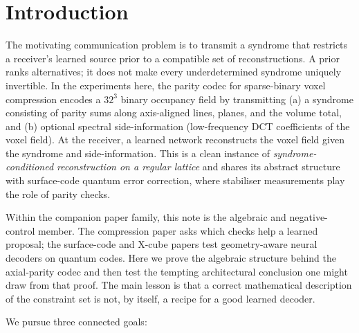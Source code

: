 \documentclass[11pt,a4paper]{article}
\begin{document}
\section{Introduction}
\label{sec:intro}

The motivating communication problem is to transmit a syndrome that
restricts a receiver's learned source prior to a compatible set of
reconstructions. A prior ranks alternatives; it does not make every
underdetermined syndrome uniquely invertible. In the experiments here,
the parity codec for sparse-binary voxel compression encodes a $32^3$
binary occupancy field by transmitting (a) a syndrome consisting of
parity sums along axis-aligned lines, planes, and the volume total,
and (b) optional spectral side-information (low-frequency DCT
coefficients of the voxel field). At the receiver, a learned network
reconstructs the voxel field given the syndrome and side-information.
This is a clean instance of \emph{syndrome-conditioned reconstruction
on a regular lattice} and shares its abstract structure with
surface-code quantum error correction, where stabiliser measurements
play the role of parity checks.

Within the companion paper family, this note is the algebraic and
negative-control member. The compression paper asks which checks help a learned
proposal; the surface-code and X-cube papers test geometry-aware neural
decoders on quantum codes. Here we prove the algebraic structure behind the
axial-parity codec and then test the tempting architectural conclusion one
might draw from that proof. The main lesson is that a correct mathematical
description of the constraint set is not, by itself, a recipe for a good
learned decoder.

We pursue three connected goals:
\end{document}
